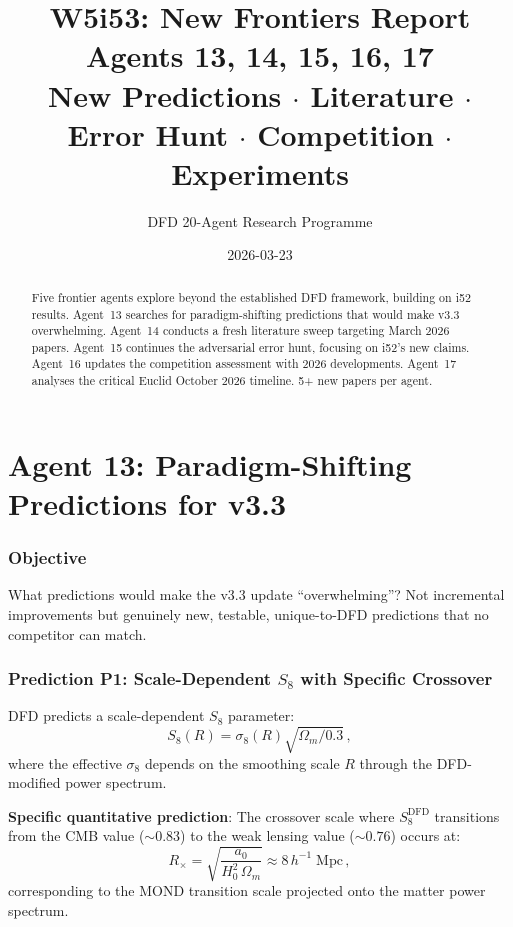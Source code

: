 \documentclass[11pt,a4paper]{article}
\title{\Huge W5i53: New Frontiers Report\\[12pt]
\Large Agents 13, 14, 15, 16, 17\\[6pt]
\large New Predictions $\cdot$ Literature $\cdot$ Error Hunt $\cdot$ Competition $\cdot$ Experiments}
\author{DFD 20-Agent Research Programme}
\date{2026-03-23}
\begin{document}
\maketitle

\begin{abstract}
Five frontier agents explore beyond the established DFD framework, building on i52 results. Agent~13 searches for paradigm-shifting predictions that would make v3.3 overwhelming. Agent~14 conducts a fresh literature sweep targeting March 2026 papers. Agent~15 continues the adversarial error hunt, focusing on i52's new claims. Agent~16 updates the competition assessment with 2026 developments. Agent~17 analyses the critical Euclid October 2026 timeline. 5+ new papers per agent.
\end{abstract}

\tableofcontents
\newpage


\part{Agent 13: Paradigm-Shifting Predictions for v3.3}
\label{part:paradigm}

\section{Objective}

What predictions would make the v3.3 update ``overwhelming''? Not incremental improvements but genuinely new, testable, unique-to-DFD predictions that no competitor can match.

\section{Prediction P1: Scale-Dependent $S_8$ with Specific Crossover}

DFD predicts a scale-dependent $S_8$ parameter:
\begin{equation}
S_8(R) = \sigma_8(R)\sqrt{\Omega_m/0.3}\,,
\end{equation}
where the effective $\sigma_8$ depends on the smoothing scale $R$ through the DFD-modified power spectrum.

\textbf{Specific quantitative prediction}: The crossover scale where $S_8^{\mathrm{DFD}}$ transitions from the CMB value ($\sim 0.83$) to the weak lensing value ($\sim 0.76$) occurs at:
\begin{equation}
R_\times = \sqrt{\frac{a_0}{H_0^2\,\Omega_m}} \approx 8\,h^{-1}\;\mathrm{Mpc}\,,
\end{equation}
corresponding to the MOND transition scale projected onto the matter power spectrum.
\end{document}
